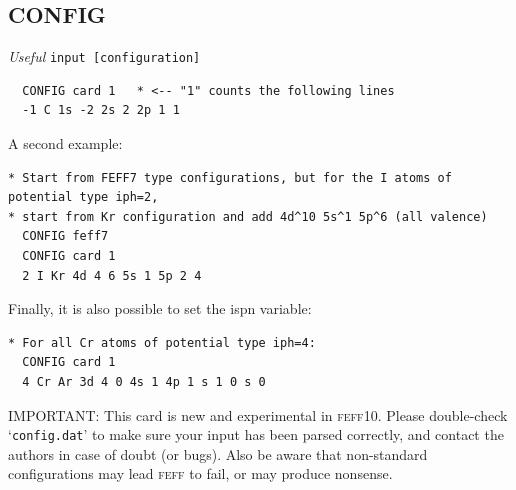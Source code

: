 \documentclass[11pt,oneside]{report} %
\newcommand{\feffcurrent}{\textsc{feff10}}
\newcommand{\program}[1]{\textsc{#1}}
\newcommand{\feff}{\program{feff}}
\newenvironment{Card}[4]%
      {\vspace{3ex}%
        \subsection{#1}
        \quad\textsl{#3}\newline
        \quad\texttt{#2}\newline%
        \label{card:#4}\\}
      {}
\newcommand{\file}[1]{`\texttt{#1}'}
\begin{document}
\begin{Card}{CONFIG}{input [configuration]}{Useful}{cfg}
\begin{verbatim}
  CONFIG card 1   * <-- "1" counts the following lines
  -1 C 1s -2 2s 2 2p 1 1
\end{verbatim}
  A second example:
\begin{verbatim} 
* Start from FEFF7 type configurations, but for the I atoms of potential type iph=2, 
* start from Kr configuration and add 4d^10 5s^1 5p^6 (all valence)
  CONFIG feff7
  CONFIG card 1
  2 I Kr 4d 4 6 5s 1 5p 2 4
\end{verbatim}
  Finally, it is also possible to set the ispn variable:
\begin{verbatim}
* For all Cr atoms of potential type iph=4: 
  CONFIG card 1
  4 Cr Ar 3d 4 0 4s 1 4p 1 s 1 0 s 0
\end{verbatim}
  IMPORTANT: This card is new and experimental in {\feffcurrent}.  Please double-check \file{config.dat} to make sure your input has been parsed correctly, and contact the authors in case of doubt (or bugs).  Also be aware that non-standard configurations may lead {\feff} to fail, or may produce nonsense.
\end{Card}
\end{document}
